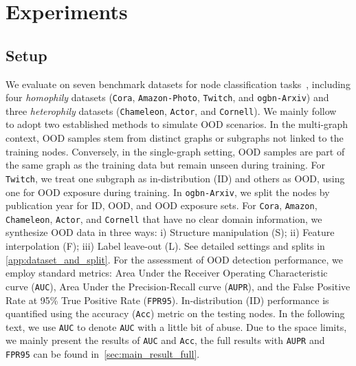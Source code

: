 \vspace{-3mm}
\section{Experiments}
\vspace{-3mm}

    
\subsection{Setup}
\vspace{-3mm}
We evaluate \shortname on seven benchmark datasets for node classification tasks~\citep{yang2016revisiting,shchur2018pitfalls,rozemberczki2021multi,wang2020microsoft,pei2020geom}, including four \textit{homophily} datasets (\texttt{Cora}, \texttt{Amazon-Photo}, \texttt{Twitch}, and \texttt{ogbn-Arxiv}) and three \textit{heterophily} datasets (\texttt{Chameleon}, \texttt{Actor}, and \texttt{Cornell}). 
We mainly follow~\citep{wu2021handling,wu2023gnnsafe} to adopt two established methods to simulate OOD scenarios. In the multi-graph context, OOD samples stem from distinct graphs or subgraphs not linked to the training nodes. Conversely, in the single-graph setting, OOD samples are part of the same graph as the training data but remain unseen during training. For \texttt{Twitch}, we treat one subgraph as in-distribution (ID) and others as OOD, using one for OOD exposure during training. In \texttt{ogbn-Arxiv}, we split the nodes by publication year for ID, OOD, and OOD exposure sets. For \texttt{Cora}, \texttt{Amazon}, \texttt{Chameleon}, \texttt{Actor}, and \texttt{Cornell} that have no clear domain information, we synthesize OOD data in three ways: i) Structure manipulation (S); ii) Feature interpolation (F); iii) Label leave-out (L). See detailed settings and splits in \cref{app:dataset_and_split}.
For the assessment of OOD detection performance, we employ standard metrics: Area Under the Receiver Operating Characteristic curve (\texttt{AUC}), Area Under the Precision-Recall curve (\texttt{AUPR}), and the False Positive Rate at 95\% True Positive Rate (\texttt{FPR95}). In-distribution (ID) performance is quantified using the accuracy (\texttt{Acc}) metric on the testing nodes. In the following text, we use \texttt{AUC} to denote \texttt{AUC} with a little bit of abuse. Due to the space limits, we mainly present the results of \texttt{AUC} and \texttt{Acc}, the full results with \texttt{AUPR} and \texttt{FPR95} can be found in~\cref{sec:main_result_full}.


